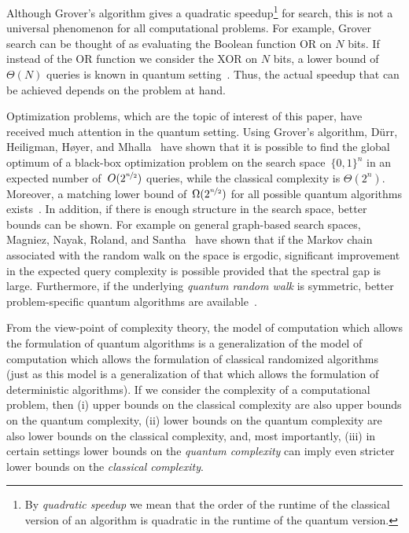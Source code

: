 \documentclass[a4paper,11pt]{article}
\begin{document}
Although Grover's algorithm gives a quadratic speedup\footnote{By \emph{quadratic speedup} we mean that the order of the runtime of the classical version of an algorithm is quadratic in the runtime of the quantum version.} for search, this is not a universal phenomenon for all computational problems. For example, Grover search can be thought of as evaluating the Boolean function OR on $N$ bits. If instead of the OR function we consider the XOR on $N$ bits, a lower bound of $\Theta(N)$ queries is known in quantum setting~\cite{Ambainis2002,BealsBCM2001}. Thus, the actual speedup that can be achieved depends on the problem at hand.

Optimization problems, which are the topic of interest of this paper, have received much attention in the quantum setting. Using Grover's algorithm, D{\"u}rr, Heiligman, H{\o}yer, and Mhalla~\cite{DurrHHM06} have shown that it is possible to find the global optimum of a black-box optimization problem on the search space~$\{0,1\}^n$ in an expected number of~${O}(2^{\nicefrac{n}{2}})$ queries, while the classical complexity is $\Theta(2^n)$. Moreover, a matching lower bound of~$\Omega(2^{\nicefrac{n}{2}})$ for all possible quantum algorithms exists~\cite{Zalka99}. In addition, if there is enough structure in the search space, better bounds can be shown. For example on general graph-based search spaces, Magniez, Nayak, Roland, and Santha~\cite[Theorem 3]{MagniezNRS12} have shown that if the Markov chain associated with the random walk on the space is ergodic, significant improvement in the expected query complexity is possible provided that the spectral gap is large. Furthermore, if the underlying \emph{quantum random walk} is symmetric, better problem-specific quantum algorithms are available~\cite{Szegedy04,MagniezNRS11}.

From the view-point of complexity theory, the model of computation which allows the formulation of quantum algorithms is a generalization of the model of computation which allows the formulation of classical randomized algorithms (just as this model is a generalization of that which allows the formulation of deterministic algorithms). If we consider the complexity of a computational problem, then (i) upper bounds on the classical complexity are also upper bounds on the quantum complexity, (ii) lower bounds on the quantum complexity are also lower bounds on the classical complexity, and, most importantly, (iii) in certain settings lower bounds on the \emph{quantum complexity} can imply even stricter lower bounds on the \emph{classical complexity}. 
\end{document}
